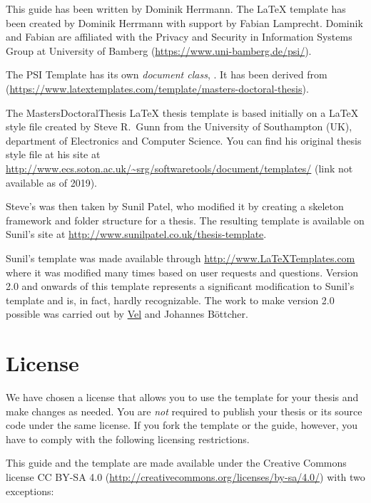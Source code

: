 This guide has been written by Dominik Herrmann. The LaTeX template has been created by Dominik Herrmann with support by Fabian Lamprecht. Dominik and Fabian are affiliated with the Privacy and Security in Information Systems Group at University of Bamberg (\url{https://www.uni-bamberg.de/psi/}).


The PSI Template has its own \emph{document class}, . It has been derived from  (\url{https://www.latextemplates.com/template/masters-doctoral-thesis}).

The MastersDoctoralThesis LaTeX thesis template is based initially on a LaTeX style file created by Steve R.\ Gunn from the University of Southampton (UK), department of Electronics and Computer Science. You can find his original thesis style file at his site at
\url{http://www.ecs.soton.ac.uk/~srg/softwaretools/document/templates/} (link not available as of 2019).

Steve's  was then taken by Sunil Patel, who modified it by creating a skeleton framework and folder structure for a thesis. The resulting template is available on Sunil's site at
\url{http://www.sunilpatel.co.uk/thesis-template}.

Sunil's template was made available through \url{http://www.LaTeXTemplates.com} where it was modified many times based on user requests and questions. Version 2.0 and onwards of this template represents a significant modification to Sunil's template and is, in fact, hardly recognizable. The work to make version 2.0 possible was carried out by \href{mailto:vel@latextemplates.com}{Vel} and Johannes Böttcher.


\section{License}
\label{sec:license}

We have chosen a license that  allows you to use the template for your thesis and make changes as needed. You are \emph{not} required to publish your thesis or its source code under the same license. If you fork the template or the guide, however, you have to comply with the following licensing restrictions.

This guide and the template are made available under the Creative Commons license 
CC BY-SA 4.0 (\url{http://creativecommons.org/licenses/by-sa/4.0/}) with two exceptions:

